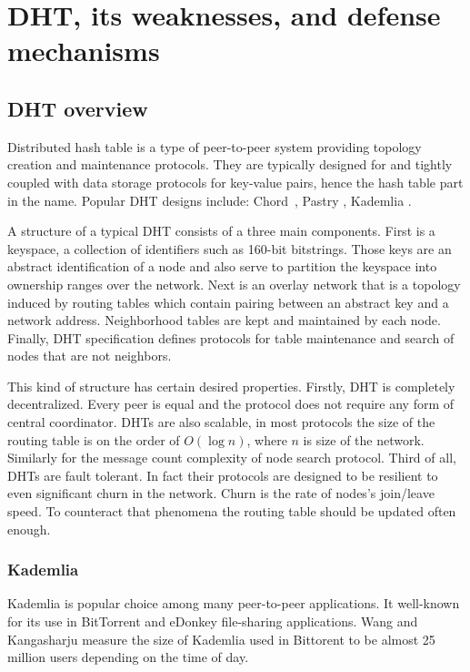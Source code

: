 \chapter{DHT, its weaknesses, and defense mechanisms}
\section{DHT overview}

  Distributed hash table is a type of peer-to-peer system providing topology
  creation and maintenance protocols. They are typically designed for and
  tightly coupled with data storage protocols for key-value pairs, hence the
  hash table part in the name. Popular DHT designs include: Chord~\cite{sto03},
  Pastry \cite{row01}, Kademlia \cite{may02}.

  A structure of a typical DHT consists of a three main components. First is a
  keyspace, a collection of identifiers such as 160-bit bitstrings. Those keys
  are an abstract identification of a node and also serve to partition the
  keyspace into ownership ranges over the network. Next is an overlay network
  that is a topology induced by routing tables which contain pairing between an
  abstract key and a network address. Neighborhood tables are kept and
  maintained by each node. Finally, DHT specification defines protocols for
  table maintenance and search of nodes that are not neighbors.

  This kind of structure has certain desired properties. Firstly, DHT is
  completely decentralized. Every peer is equal and the protocol does not
  require any form of central coordinator. DHTs are also scalable, in most
  protocols the size of the routing table is on the order of $O(\log n)$, where
  $n$ is size of the network. Similarly for the message count complexity of node
  search protocol. Third of all, DHTs are fault tolerant. In fact their
  protocols are designed to be resilient to even significant churn in the
  network. Churn is the rate of nodes's join/leave speed. To counteract that
  phenomena the routing table should be updated often enough.
 
  \subsection{Kademlia}
  Kademlia \cite{may02} is popular choice among many peer-to-peer applications.
  It well-known for its use in BitTorrent and eDonkey file-sharing applications.
  Wang and Kangasharju \cite{wan13} measure the size of Kademlia used in
  Bittorent to be almost 25 million users depending on the time of day.

